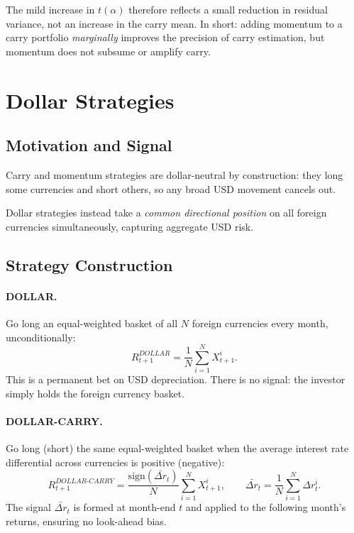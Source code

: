 \documentclass[a4paper,12pt]{article}
\begin{document}
The mild increase in $t(\alpha)$ therefore reflects a small reduction in residual variance,
not an increase in the carry mean. In short: adding momentum to a carry portfolio
\emph{marginally} improves the precision of carry estimation, but momentum does not subsume
or amplify carry.

\section{Dollar Strategies}
\label{sec:dollar}

\subsection{Motivation and Signal}

Carry and momentum strategies are dollar-neutral by construction: they long some currencies
and short others, so any broad USD movement cancels out.

Dollar strategies instead take a \emph{common directional position} on all foreign
currencies simultaneously, capturing aggregate USD risk.

\subsection{Strategy Construction}

\paragraph{DOLLAR.}
Go long an equal-weighted basket of all $N$ foreign currencies every month, unconditionally:
\begin{equation}
    R^{DOLLAR}_{t+1} = \frac{1}{N}\sum_{i=1}^N X^i_{t+1}.
\end{equation}
This is a permanent bet on USD depreciation. There is no signal: the investor simply holds
the foreign currency basket.

\paragraph{DOLLAR-CARRY.}
Go long (short) the same equal-weighted basket when the average interest rate differential
across currencies is positive (negative):
\begin{equation}
    R^{DOLLAR\text{-}CARRY}_{t+1} = \frac{\mathrm{sign}(\bar{\Delta r}_t)}{N}\sum_{i=1}^N X^i_{t+1},
    \qquad \bar{\Delta r}_t = \frac{1}{N}\sum_{i=1}^N \Delta r^i_t.
\end{equation}
The signal $\bar{\Delta r}_t$ is formed at month-end $t$ and applied to the following
month's returns, ensuring no look-ahead bias.
\end{document}
